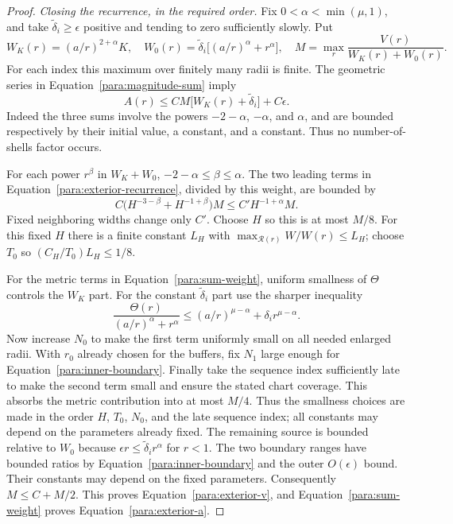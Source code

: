 \begin{proof}
\emph{Closing the recurrence, in the required order.}
Fix $0<\alpha<\min(\mu,1)$, and take
$\widetilde\delta_i\ge\epsilon$ positive and tending to zero
sufficiently slowly.  Put
\[
 W_K(r)=(a/r)^{2+\alpha}K,\quad
 W_0(r)=\widetilde\delta_i\bigl[(a/r)^\alpha+r^\alpha\bigr],\quad
 M=\max_r\frac{V(r)}{W_K(r)+W_0(r)}.
\]
For each index this maximum over finitely many radii is finite.
The geometric series in Equation~\eqref{para:magnitude-sum} imply
\begin{equation}
 A(r)\le C M\bigl[W_K(r)+\widetilde\delta_i\bigr]+C\epsilon.
 \label{para:sum-weight}
\end{equation}
Indeed the three sums involve the powers $-2-\alpha$, $-\alpha$,
and $\alpha$, and are bounded respectively by their initial value,
a constant, and a constant.  Thus no number-of-shells factor occurs.

For each power $r^\beta$ in $W_K+W_0$,
$-2-\alpha\le\beta\le\alpha$.  The two leading terms in
Equation~\eqref{para:exterior-recurrence}, divided by this weight,
are bounded by
\[
 C\bigl(H^{-3-\beta}+H^{-1+\beta}\bigr)M
 \le C' H^{-1+\alpha}M.
\]
Fixed neighboring widths change only $C'$.  Choose $H$ so this
is at most $M/8$.  For this fixed $H$ there is a finite constant
$L_H$ with $\max_{\mathcal R(r)}W/W(r)\le L_H$; choose $T_0$
so $(C_H/T_0)L_H\le1/8$.

For the metric terms in Equation~\eqref{para:sum-weight}, uniform
smallness of $\Theta$ controls the $W_K$ part.  For the constant
$\widetilde\delta_i$ part use the sharper inequality
\begin{equation}
 \frac{\Theta(r)}{(a/r)^\alpha+r^\alpha}
 \le (a/r)^{\mu-\alpha}+\delta_i r^{\mu-\alpha}.
 \label{para:metric-ratio}
\end{equation}
Now increase $N_0$ to make the first term uniformly small on all
needed enlarged radii.  With $r_0$ already chosen for the buffers,
fix $N_1$ large enough for Equation~\eqref{para:inner-boundary}.
Finally take the sequence index sufficiently late to make the second
term small and ensure the stated chart coverage.  This absorbs the
metric contribution into at most $M/4$.  Thus the smallness choices
are made in the order $H$, $T_0$, $N_0$, and the late sequence index;
all constants may depend on the parameters already fixed.
The remaining source is bounded relative to $W_0$ because
$\epsilon r\le\widetilde\delta_i r^\alpha$ for $r<1$.
The two boundary ranges have bounded ratios by
Equation~\eqref{para:inner-boundary} and the outer $O(\epsilon)$
bound.  Their constants may depend on the fixed parameters.
Consequently $M\le C+M/2$.  This proves
Equation~\eqref{para:exterior-v}, and
Equation~\eqref{para:sum-weight} proves Equation~\eqref{para:exterior-a}.
\end{proof}

